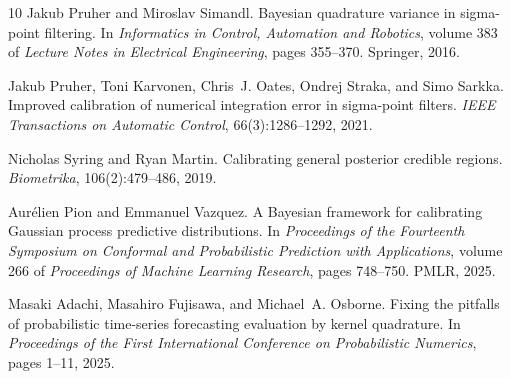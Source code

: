 \documentclass{article}
\begin{document}
{\begin{thebibliography}{10}
Jakub Pruher and Miroslav Simandl.
\newblock Bayesian quadrature variance in sigma-point filtering.
\newblock In \emph{Informatics in Control, Automation and Robotics}, volume 383 of \emph{Lecture Notes in Electrical Engineering}, pages 355--370. Springer, 2016.

Jakub Pruher, Toni Karvonen, Chris~J. Oates, Ondrej Straka, and Simo Sarkka.
\newblock Improved calibration of numerical integration error in sigma-point filters.
\newblock \emph{IEEE Transactions on Automatic Control}, 66(3):1286--1292, 2021.

Nicholas Syring and Ryan Martin.
\newblock Calibrating general posterior credible regions.
\newblock \emph{Biometrika}, 106(2):479--486, 2019.

Aur\'elien Pion and Emmanuel Vazquez.
\newblock A Bayesian framework for calibrating Gaussian process predictive distributions.
\newblock In \emph{Proceedings of the Fourteenth Symposium on Conformal and Probabilistic Prediction with Applications}, volume 266 of \emph{Proceedings of Machine Learning Research}, pages 748--750. PMLR, 2025.

Masaki Adachi, Masahiro Fujisawa, and Michael~A. Osborne.
\newblock Fixing the pitfalls of probabilistic time-series forecasting evaluation by kernel quadrature.
\newblock In \emph{Proceedings of the First International Conference on Probabilistic Numerics}, pages 1--11, 2025.

\end{thebibliography}
}
\end{document}
